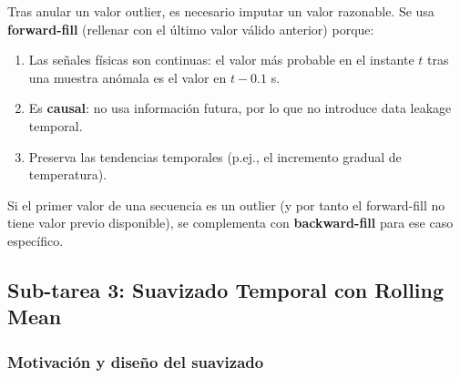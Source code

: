 \documentclass[12pt,a4paper]{article}
\begin{document}
Tras anular un valor outlier, es necesario imputar un valor razonable.
Se usa \textbf{forward-fill} (rellenar con el último valor válido anterior) porque:

\begin{enumerate}[leftmargin=2em]
  \item Las señales físicas son continuas: el valor más probable en el instante $t$
    tras una muestra anómala es el valor en $t - 0.1$ s.
  \item Es \textbf{causal}: no usa información futura, por lo que no introduce
    data leakage temporal.
  \item Preserva las tendencias temporales (p.ej., el incremento gradual de temperatura).
\end{enumerate}

Si el primer valor de una secuencia es un outlier (y por tanto el forward-fill no
tiene valor previo disponible), se complementa con \textbf{backward-fill} para
ese caso específico.

\subsection{Sub-tarea 3: Suavizado Temporal con Rolling Mean}

\subsubsection{Motivación y diseño del suavizado}
\end{document}
